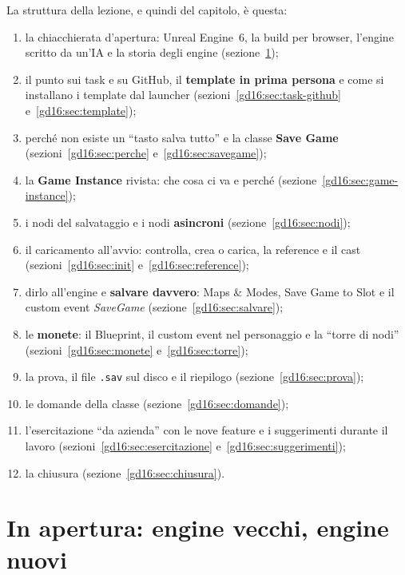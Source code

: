 La struttura della lezione, e quindi del capitolo, è questa:
\begin{enumerate}
  \item la chiacchierata d'apertura: Unreal Engine~6, la build per browser,
        l'engine scritto da un'IA e la storia degli engine
        (sezione~\ref{gd16:sec:apertura});
  \item il punto sui task e su GitHub, il \textbf{template in prima persona} e
        come si installano i template dal launcher
        (sezioni~\ref{gd16:sec:task-github} e~\ref{gd16:sec:template});
  \item perché non esiste un ``tasto salva tutto'' e la classe
        \textbf{Save Game} (sezioni~\ref{gd16:sec:perche}
        e~\ref{gd16:sec:savegame});
  \item la \textbf{Game Instance} rivista: che cosa ci va e perché
        (sezione~\ref{gd16:sec:game-instance});
  \item i nodi del salvataggio e i nodi \textbf{asincroni}
        (sezione~\ref{gd16:sec:nodi});
  \item il caricamento all'avvio: controlla, crea o carica, la reference e il
        cast (sezioni~\ref{gd16:sec:init} e~\ref{gd16:sec:reference});
  \item dirlo all'engine e \textbf{salvare davvero}: Maps \& Modes, Save Game
        to Slot e il custom event \emph{SaveGame}
        (sezione~\ref{gd16:sec:salvare});
  \item le \textbf{monete}: il Blueprint, il custom event nel personaggio e la
        ``torre di nodi'' (sezioni~\ref{gd16:sec:monete}
        e~\ref{gd16:sec:torre});
  \item la prova, il file \texttt{.sav} sul disco e il riepilogo
        (sezione~\ref{gd16:sec:prova});
  \item le domande della classe (sezione~\ref{gd16:sec:domande});
  \item l'esercitazione ``da azienda'' con le nove feature e i suggerimenti
        durante il lavoro (sezioni~\ref{gd16:sec:esercitazione}
        e~\ref{gd16:sec:suggerimenti});
  \item la chiusura (sezione~\ref{gd16:sec:chiusura}).
\end{enumerate}

\section{In apertura: engine vecchi, engine nuovi}
\label{gd16:sec:apertura}

